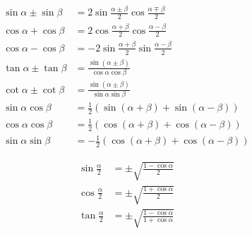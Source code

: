 \documentclass[11pt,twoside]{article}
\begin{document}
\begin{multicols}{3}
\begin{footnotesize}
\begin{equation}
\begin{split}
\sin\alpha\pm\sin\beta&=2\sin\frac{\alpha\pm\beta}{2}\cos\frac{\alpha\mp\beta}{2} \\
\cos\alpha+\cos\beta&=2\cos\frac{\alpha+\beta}{2}\cos\frac{\alpha-\beta}{2} \\
\cos\alpha-\cos\beta&=-2\sin\frac{\alpha+\beta}{2}\sin\frac{\alpha-\beta}{2} \\
\tan\alpha \pm \tan\beta &= \frac{\sin(\alpha\pm\beta)}{\cos\alpha\cos\beta} \\
\cot\alpha \pm \cot\beta &= \frac{\sin(\alpha\pm\beta)}{\sin\alpha\sin\beta} \\
\sin\alpha\cos\beta&=\frac{1}{2}(\sin(\alpha+\beta)+\sin(\alpha-\beta)) \\
\cos\alpha\cos\beta&=\frac{1}{2}(\cos(\alpha+\beta)+\cos(\alpha-\beta)) \\
\sin\alpha\sin\beta &= -\frac{1}{2}(\cos(\alpha+\beta)+\cos(\alpha-\beta))
\end{split}
\end{equation}

\begin{equation}
\begin{split}
\sin\frac{\alpha}{2}&=\pm\sqrt{\frac{1-\cos\alpha}{2}} \\
\cos\frac{\alpha}{2}&=\pm\sqrt{\frac{1+\cos\alpha}{2}} \\
\tan\frac{\alpha}{2}&=\pm\sqrt{\frac{1-\cos\alpha}{1+\cos\alpha}}
\end{split}
\end{equation}

\end{footnotesize}
\end{multicols}
\end{document}

